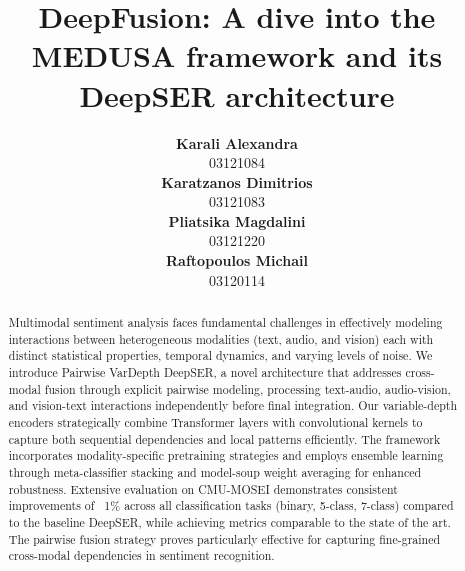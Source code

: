 \documentclass[10pt]{article}
\title{\textbf{DeepFusion: A dive into the MEDUSA framework and its DeepSER architecture}}
\author{
    \centering
    \begin{minipage}{0.24\linewidth}
        \centering
        \textbf{Karali Alexandra} \\ 03121084
    \end{minipage}
    \begin{minipage}{0.24\linewidth}
        \centering
        \textbf{Karatzanos Dimitrios} \\ 03121083
    \end{minipage}
    \begin{minipage}{0.24\linewidth}
        \centering
        \textbf{Pliatsika Magdalini} \\ 03121220
    \end{minipage}
    \begin{minipage}{0.24\linewidth}
        \centering
        \textbf{Raftopoulos Michail} \\ 03120114
    \end{minipage}
}
\affil{Supervisors: Georgiou Efthymios, Potamianos Alexandros}
\affil{School of ECE, National Technical University of Athens}
\begin{document}
\maketitle
\begin{abstract}
    Multimodal sentiment analysis faces fundamental challenges in effectively modeling interactions between heterogeneous modalities (text, audio, and vision) each with distinct statistical properties, temporal dynamics, and varying levels of noise. We introduce Pairwise VarDepth DeepSER, a novel architecture that addresses cross-modal fusion through explicit pairwise modeling, processing text-audio, audio-vision, and vision-text interactions independently before final integration. Our variable-depth encoders strategically combine Transformer layers with convolutional kernels to capture both sequential dependencies and local patterns efficiently. The framework incorporates modality-specific pretraining strategies and employs ensemble learning through meta-classifier stacking and model-soup weight averaging for enhanced robustness. Extensive evaluation on CMU-MOSEI demonstrates consistent improvements of ~1\% across all classification tasks (binary, 5-class, 7-class) compared to the baseline DeepSER, while achieving metrics comparable to the state of the art. The pairwise fusion strategy proves particularly effective for capturing fine-grained cross-modal dependencies in sentiment recognition.
\end{abstract}
\end{document}
